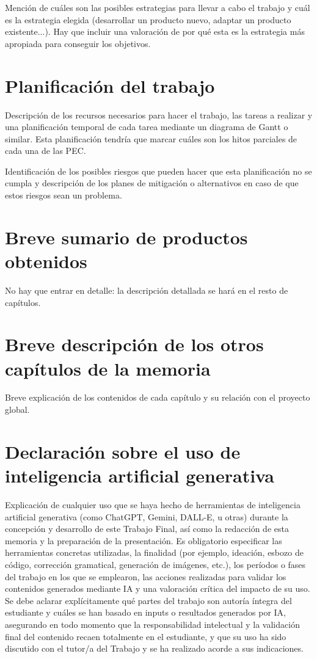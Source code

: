 \documentclass[IB,BIB]{TFUOC}%
\begin{document}
Mención de cuáles son las posibles estrategias para llevar a cabo el trabajo y cuál es la estrategia elegida (desarrollar un producto nuevo, adaptar un producto existente...). Hay que incluir una valoración de por qué esta es la estrategia más apropiada para conseguir los objetivos.   	



\section{Planificación del trabajo}

Descripción de los recursos necesarios para hacer el trabajo, las tareas a realizar y una planificación temporal de cada tarea mediante un diagrama de Gantt o similar. Esta planificación tendría que marcar cuáles son los hitos parciales de cada una de las PEC.

Identificación de los posibles riesgos que pueden hacer que esta planificación no se cumpla y descripción de los planes de mitigación o alternativos en caso de que estos riesgos sean un problema.


\section{Breve sumario de productos obtenidos}

No hay que entrar en detalle: la descripción detallada se hará en el resto de capítulos.


\section{Breve descripción de los otros capítulos de la memoria}

Breve explicación de los contenidos de cada capítulo y su relación con el proyecto global.

\section{Declaración sobre el uso de inteligencia artificial generativa}

Explicación de cualquier uso que se haya hecho de herramientas de inteligencia artificial generativa (como ChatGPT, Gemini, DALL-E, u otras) durante la concepción y desarrollo de este Trabajo Final, así como la redacción de esta memoria y la preparación de la presentación. Es obligatorio especificar las herramientas concretas utilizadas, la finalidad (por ejemplo, ideación, esbozo de código, corrección gramatical, generación de imágenes, etc.), los períodos o fases del trabajo en los que se emplearon, las acciones realizadas para validar los contenidos generados mediante IA y una valoración crítica del impacto de su uso. Se debe aclarar explícitamente qué partes del trabajo son autoría íntegra del estudiante y cuáles se han basado en inputs o resultados generados por IA, asegurando en todo momento que la responsabilidad intelectual y la validación final del contenido recaen totalmente en el estudiante, y que su uso ha sido discutido con el tutor/a del Trabajo y se ha realizado acorde a sus indicaciones. 
\end{document}
